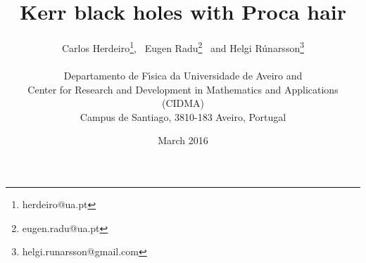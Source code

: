 \newcommand{\ii}{\mbox{i}}
\newcommand{\e}{\mbox{e}}
\newcommand{\pa}{\partial}
\newcommand{\Om}{\Omega}
\newcommand{\vep}{\varepsilon}
\newcommand{\bfph}{{\bf \phi}}
\newcommand{\lm}{\lambda}
\def\theequation{\arabic{equation}}
\renewcommand{\thefootnote}{\fnsymbol{footnote}}
\newcommand{\re}[1]{(\ref{#1})}
\newcommand{\R}{{\rm I \hspace{-0.52ex} R}}
\newcommand{\N}{{\sf N\hspace*{-1.0ex}\rule{0.15ex}%
{1.3ex}\hspace*{1.0ex}}}
\newcommand{\Q}{{\sf Q\hspace*{-1.1ex}\rule{0.15ex}%
{1.5ex}\hspace*{1.1ex}}}
\newcommand{\C}{{\sf C\hspace*{-0.9ex}\rule{0.15ex}%
{1.3ex}\hspace*{0.9ex}}}
\newcommand{\eins}{1\hspace{-0.56ex}{\rm I}}
\renewcommand{\thefootnote}{\arabic{footnote}}

\def\theequation{\thesection.\arabic{equation}}









\title{\bf \Large Kerr black holes with Proca hair}

 \author{
{\large Carlos Herdeiro}\footnote{herdeiro@ua.pt}, \
{\large Eugen Radu}\footnote{eugen.radu@ua.pt} \
and
{\large Helgi R\'unarsson}\footnote{helgi.runarsson@gmail.com}
\\ 
\\
{\small Departamento de F\'\i sica da Universidade de Aveiro and} \\ 
{\small Center for Research and Development in Mathematics and Applications (CIDMA)} \\ 
{\small   Campus de Santiago, 3810-183 Aveiro, Portugal}
}


 
 

\date{March 2016}
\maketitle

